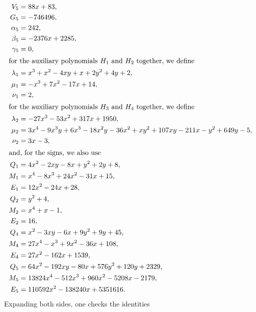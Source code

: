 \documentclass[11pt]{article}
\begin{document}
\begin{align*}
V_{5}&=88x+83,\\
G_{5}&=-746496,\\
\alpha_{5}&=242,\\
\beta_{5}&=-2376x+2285,\\
\gamma_{5}&=0,\\
\intertext{for the auxiliary polynomials $H_{1}$ and $H_{2}$ together, we define}
\lambda_{1}&=x^{3}+x^{2}-4xy+x+2y^{2}+4y+2,\\
\mu_{1}&=-x^{3}+7x^{2}-17x+14,\\
\nu_{1}&=2,\\
\intertext{for the auxiliary polynomials $H_{3}$ and $H_{4}$ together, we define}
\lambda_{2}&=-27x^{3}-53x^{2}+317x+1950,\\
\mu_{2}&=3x^{4}-9x^{3}y+6x^{3}-18x^{2}y-36x^{2}+xy^{2}+107xy-211x-y^{2}+649y-5,\\
\nu_{2}&=3x-3,\\
\intertext{and, for the signs, we also use}
Q_{1}&=4x^{2}-2xy-8x+y^{2}+2y+8,\\
M_{1}&=x^{4}-8x^{3}+24x^{2}-31x+15,\\
E_{1}&=12x^{2}-24x+28,\\
Q_{2}&=y^{2}+4,\\
M_{2}&=x^{4}+x-1,\\
E_{2}&=16,\\
Q_{4}&=x^{2}-3xy-6x+9y^{2}+9y+45,\\
M_{4}&=27x^{4}-x^{3}+9x^{2}-36x+108,\\
E_{4}&=27x^{2}-162x+1539,\\
Q_{5}&=64x^{2}-192xy-80x+576y^{2}+120y+2329,\\
M_{5}&=13824x^{4}-512x^{3}+960x^{2}-5208x-2179,\\
E_{5}&=110592x^{2}-138240x+5351616.
\end{align*}
Expanding both sides, one checks the identities
\end{document}
